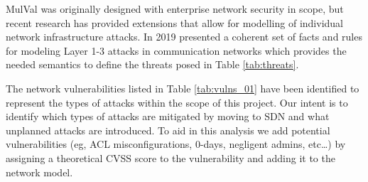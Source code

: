 MulVal was originally designed with enterprise network security in scope, but recent research\cite{Acosta_Padilla_Homer_2016, Bacic_Froh_Henderson_2006, Henderson_Bacic_Froh_2005} has provided extensions that allow for modelling of individual network infrastructure attacks. In 2019 \cite{Stan_Bitton_Ezrets_Dadon_Inokuchi_Ohta_Yamada_Yagyu_Elovici_Shabtai_2019} presented a coherent set of facts and rules for modeling Layer 1-3 attacks in communication networks which provides the needed semantics to define the threats posed in Table \ref{tab:threats}. 

The network vulnerabilities listed in Table \ref{tab:vulns_01} have been identified to represent the types of attacks within the scope of this project. Our intent is to identify which types of attacks are mitigated by moving to SDN and what unplanned attacks are introduced. To aid in this analysis we add potential vulnerabilities (eg, ACL misconfigurations, 0-days, negligent admins, etc…) by assigning a theoretical CVSS score to the vulnerability and adding it to the network model.  



